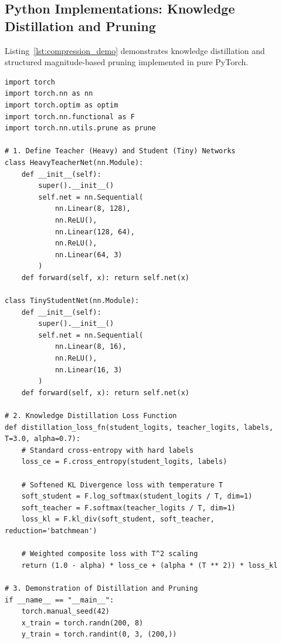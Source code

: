 \subsection{Python Implementations: Knowledge Distillation and Pruning}\label{subsec:code_compression}

Listing~\ref{lst:compression_demo} demonstrates knowledge distillation and structured magnitude-based pruning implemented in pure PyTorch.

\begin{lstlisting}[style=pythonstyle, caption={Knowledge distillation training loop and structured pruning in PyTorch.}, label={lst:compression_demo}]
import torch
import torch.nn as nn
import torch.optim as optim
import torch.nn.functional as F
import torch.nn.utils.prune as prune

# 1. Define Teacher (Heavy) and Student (Tiny) Networks
class HeavyTeacherNet(nn.Module):
    def __init__(self):
        super().__init__()
        self.net = nn.Sequential(
            nn.Linear(8, 128),
            nn.ReLU(),
            nn.Linear(128, 64),
            nn.ReLU(),
            nn.Linear(64, 3)
        )
    def forward(self, x): return self.net(x)

class TinyStudentNet(nn.Module):
    def __init__(self):
        super().__init__()
        self.net = nn.Sequential(
            nn.Linear(8, 16),
            nn.ReLU(),
            nn.Linear(16, 3)
        )
    def forward(self, x): return self.net(x)

# 2. Knowledge Distillation Loss Function
def distillation_loss_fn(student_logits, teacher_logits, labels, T=3.0, alpha=0.7):
    # Standard cross-entropy with hard labels
    loss_ce = F.cross_entropy(student_logits, labels)
    
    # Softened KL Divergence loss with temperature T
    soft_student = F.log_softmax(student_logits / T, dim=1)
    soft_teacher = F.softmax(teacher_logits / T, dim=1)
    loss_kl = F.kl_div(soft_student, soft_teacher, reduction='batchmean')
    
    # Weighted composite loss with T^2 scaling
    return (1.0 - alpha) * loss_ce + (alpha * (T ** 2)) * loss_kl

# 3. Demonstration of Distillation and Pruning
if __name__ == "__main__":
    torch.manual_seed(42)
    x_train = torch.randn(200, 8)
    y_train = torch.randint(0, 3, (200,))


\end{lstlisting}
